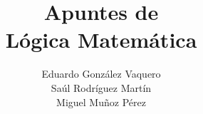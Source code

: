 \documentclass{report}
\theoremstyle{definition}
\theoremstyle{remark}
\numberwithin{section}{chapter}
\numberwithin{equation}{chapter}
\begin{document}
\frontmatter

\title{Apuntes de\\ Lógica Matemática}


\author{Eduardo González Vaquero\\ Saúl Rodríguez Martín\\ Miguel Muñoz Pérez}

\maketitle


\setcounter{page}{4}

\tableofcontents



\mainmatter


\appendix

\backmatter

\printindex
\end{document}
